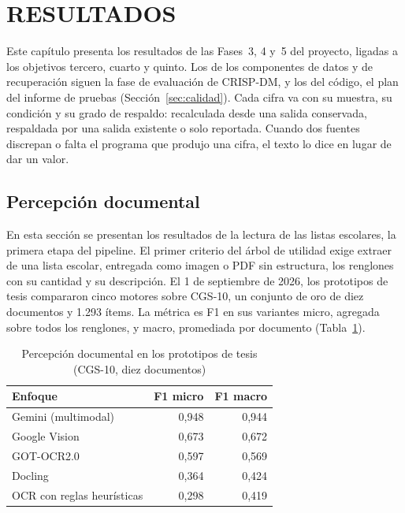 \setcounter{subsection}{0}
\section{RESULTADOS}

Este capítulo presenta los resultados de las Fases~3, 4 y~5 del proyecto, ligadas a los objetivos
tercero, cuarto y quinto. Los de los componentes de datos y de recuperación siguen la fase de
evaluación de CRISP-DM, y los del código, el plan del informe de pruebas
(Sección~\ref{sec:calidad}). Cada cifra va con su muestra, su condición y su grado de respaldo: recalculada desde una
salida conservada, respaldada por una salida existente o solo reportada. Cuando dos fuentes
discrepan o falta el programa que produjo una cifra, el texto lo dice en lugar de dar un valor.

\subsection{Percepción documental}
\label{sec:percepcion}

En esta sección se presentan los resultados de la lectura de las listas escolares, la primera etapa
del pipeline. El primer criterio del árbol de utilidad exige extraer de una lista escolar, entregada como imagen
o PDF sin estructura, los renglones con su cantidad y su descripción. El 1 de septiembre de 2026,
los prototipos de tesis compararon cinco motores sobre CGS-10, un conjunto de oro de diez documentos
y 1.293 ítems. La métrica es F1 en sus variantes micro, agregada sobre todos los renglones, y macro,
promediada por documento (Tabla~\ref{tab:percepcion}).

\begin{table}[htbp]
\centering
\caption{Percepción documental en los prototipos de tesis (CGS-10, diez documentos)}
\label{tab:percepcion}
\small
\begin{tabular}{@{}lrr@{}}
\toprule
\textbf{Enfoque} & \textbf{F1 micro} & \textbf{F1 macro} \\
\midrule
Gemini (multimodal) & 0,948 & 0,944 \\
Google Vision & 0,673 & 0,672 \\
GOT-OCR2.0 & 0,597 & 0,569 \\
Docling & 0,364 & 0,424 \\
OCR con reglas heurísticas & 0,298 & 0,419 \\
\bottomrule
\end{tabular}
\end{table}

